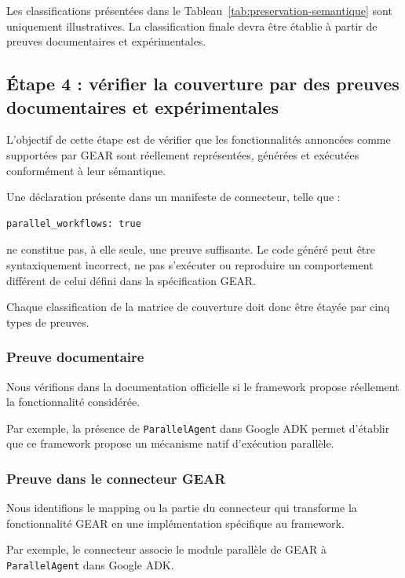 Les classifications présentées dans le
Tableau~\ref{tab:preservation-semantique} sont uniquement illustratives.
La classification finale devra être établie à partir de preuves
documentaires et expérimentales.


\subsection{Étape 4 : vérifier la couverture par des preuves documentaires et expérimentales}
\label{subsec:preuves-couverture}

L'objectif de cette étape est de vérifier que les fonctionnalités
annoncées comme supportées par GEAR sont réellement représentées,
générées et exécutées conformément à leur sémantique.

Une déclaration présente dans un manifeste de connecteur, telle que :

\begin{verbatim}
parallel_workflows: true
\end{verbatim}

ne constitue pas, à elle seule, une preuve suffisante. Le code généré
peut être syntaxiquement incorrect, ne pas s'exécuter ou reproduire un
comportement différent de celui défini dans la spécification GEAR.

Chaque classification de la matrice de couverture doit donc être
étayée par cinq types de preuves.


\subsubsection{Preuve documentaire}

Nous vérifions dans la documentation officielle si le framework propose
réellement la fonctionnalité considérée.

Par exemple, la présence de \texttt{ParallelAgent} dans Google ADK
permet d'établir que ce framework propose un mécanisme natif
d'exécution parallèle.


\subsubsection{Preuve dans le connecteur GEAR}

Nous identifions le mapping ou la partie du connecteur qui transforme
la fonctionnalité GEAR en une implémentation spécifique au framework.

Par exemple, le connecteur associe le module parallèle de GEAR à
\texttt{ParallelAgent} dans Google ADK.

